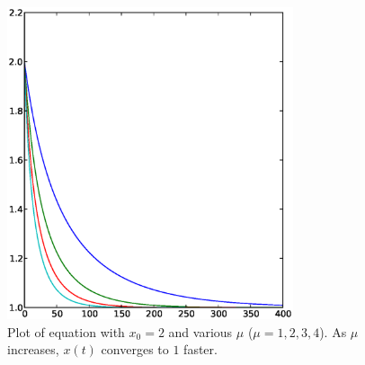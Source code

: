 \documentclass[12pt,twoside]{book}
\begin{document}
\begin{figure}[h]
  \begin{center}
    \includegraphics[width=0.75\textwidth]{logistic_diffeq_mu1234_x2}
  \end{center}
  \caption{
    Plot of equation  with $x_0 = 2$ and various $\mu$ ($\mu = 1,2,3,4$).
    As $\mu$ increases, $x(t)$ converges to $1$ faster.
  }
  \label{fig:lde2}
\end{figure}
\end{document}
